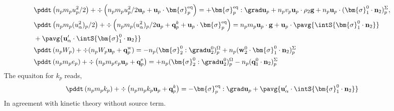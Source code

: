 \begin{align*}
    &\pddt \left(n_p m_p u_p^2/ 2\right)
    + \div \left(n_p
    m_p u_p^2/ 2 \textbf{u}_p 
    + \textbf{u}_p \cdot \bm{\sigma}_p^\text{eq}
    \right)
    = 
    + \bm{\sigma}_p^\text{eq}  :\grad \textbf{u}_p
    +  n_p v_p \textbf{u}_p \cdot 
    \rho_2 \textbf{g}
    + n_p \textbf{u}_p \cdot (\bm{\sigma}_1^0 \cdot \textbf{n}_2)^\Sigma_p,\\
    &\pddt \left(n_p m_p (u_\alpha^2)_p/ 2\right)
    + \div \left(n_p
    m_p (u_\alpha^2)_p/ 2 \textbf{u}_p 
    + \textbf{q}^k_p
    + \textbf{u}_p \cdot \bm{\sigma}_p^\text{eq}
    \right)
    = 
    n_p m_p \textbf{u}_p \cdot
    \textbf{g}
    + \textbf{u}_p\cdot\pavg{\intS{\bm{\sigma}_1^0 \cdot \textbf{n}_2}}\\
    &+ \pavg{\textbf{u}_\alpha'\cdot\intS{\bm{\sigma}_1^0 \cdot \textbf{n}_2}}
    \\
    &\pddt \left(n_p W_p\right)
    + \div 
    (n_p W_p
    \textbf{u}_p 
    +  \textbf{q}_p^\text{w}
    )
    = 
    - n_p (\bm{\sigma}_2^0 : \grad\textbf{u}_2^0)^\Omega_p
    + n_p (\textbf{w}_2^0 \cdot \bm{\sigma}_1^0 \cdot  \textbf{n}_2)^\Sigma_p
    \\
    &\pddt \left(n_p m_p e_p\right)
    + \div \left(n_p
    m_p e_p \textbf{u}_p 
    +  \textbf{q}_p^\text{e}
    \right)
    = 
    + n_p (\bm{\sigma}_2^0 : \grad\textbf{u}_2^0)^\Omega_p
    - n_p (\textbf{q}_1^0\cdot \textbf{n}_2)^\Sigma_p\\
\end{align*}
The equaiton for $k_p$ reads, 
\begin{equation*}
    \pddt \left(n_p m_p k_p\right)
    + \div \left(n_p
    m_p k_p \textbf{u}_p 
    + \textbf{q}^k_p
    \right)
    = 
    - \bm{\sigma}_p^\text{eq}  :\grad \textbf{u}_p
    + \pavg{\textbf{u}_\alpha'\cdot\intS{\bm{\sigma}_1^0 \cdot \textbf{n}_2}}
\end{equation*}
In agreement with kinetic theory without source term. 


